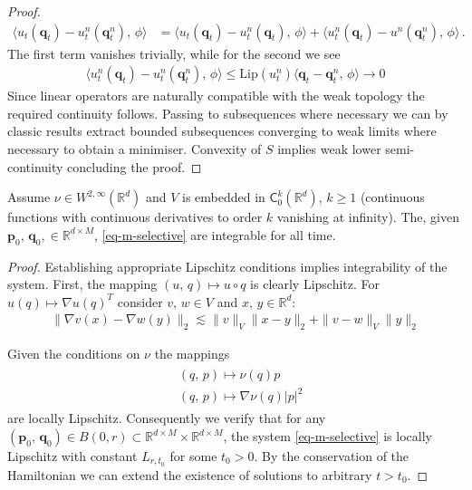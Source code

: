 \documentclass[runningheads]{llncs}
\newcommand{\norm}[2]{\| #1 \|_{ #2 }}
\newcommand{\vnorm}[1]{\norm{ #1 }{V}}
\newcommand{\ltwonorm}[1]{\norm{ #1 }{2}}
\newcommand{\Rd}{\mathbb{R}^{d}}
\newcommand{\RdM}{\mathbb{R}^{d\times M}}
\begin{document}
\begin{proof}
\begin{align*}
\langle u_t(\mathbf q_t)-u_t^n(\mathbf q_t^n),\,\phi\rangle & = \langle
u_t(\mathbf q_t)- u_t^n(\mathbf q_t),\,\phi\rangle + \langle u_t^n(\mathbf
q_t)-u^n(\mathbf q_t^n),\,\phi\rangle\,.
\end{align*}
The first term vanishes trivially, while for the second we see
\begin{align*}
\langle u_t^n(\mathbf q_t)-u_t^n(\mathbf q_t^n),\,\phi\rangle \leq \text{Lip}(u_t^n)\langle \mathbf q_t-\mathbf q_t^n,\,\phi\rangle \rightarrow 0
\end{align*}
Since linear operators are naturally compatible with the weak topology the
required continuity follows.  Passing to subsequences where necessary we can by
classic results extract bounded subsequences converging to weak limits where
necessary to obtain a minimiser. Convexity of $S$ implies weak lower
semi-continuity concluding the proof.

\end{proof}
\begin{theorem}
Assume $\nu \in W^{2, \infty}(\Rd)$ and $V$ is embedded in
$\textsf{C}_0^k(\Rd)$, $k\geq 1$ (continuous functions with continuous
derivatives to order $k$ vanishing at infinity). The, given $\mathbf
p_0,\,\mathbf q_0, \in \RdM$, \eqref{eq-m-selective} are integrable for all
time.

\end{theorem}
\begin{proof}
  
Establishing appropriate Lipschitz conditions implies integrability of the
system. First, the mapping $(u,\,q)\mapsto u\circ q$ is clearly Lipschitz. For
$u(q)\mapsto\nabla u(q)^T$ consider $v,\,w \in V$ and $x,\,y\in\Rd$:
\begin{align}
\ltwonorm{\nabla v(x) - \nabla w(y)} \lesssim \vnorm{v} \ltwonorm{x-y} + \vnorm{v-w}\ltwonorm{y}
\end{align}

Given the conditions on $\nu$ the mappings
\begin{align}
  \begin{split}
    & (q,\,p)\mapsto \nu(q)p\\
    &(q,\,p)\mapsto \nabla \nu(q)|p|^2
  \end{split}\label{nu_maps}
\end{align}
are locally Lipschitz. Consequently we verify that for any $(\mathbf
p_0,\,\mathbf q_0)\in B(0,r)\subset \RdM\times\RdM$, the system
\eqref{eq-m-selective} is locally Lipschitz with constant $L_{r,t_0}$ for some
$t_0>0$. By the conservation of the Hamiltonian we can extend the existence of
solutions to arbitrary $t>t_0$.
\end{proof}
\end{document}

